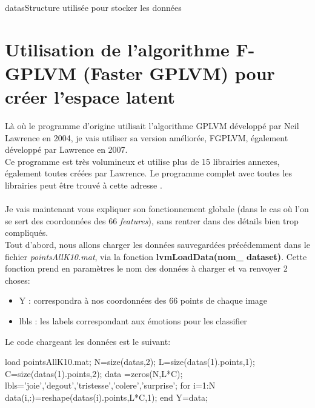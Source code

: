 \documentclass[poster]{polytech/polytech}
\begin{document}
\begin{Figure}{datas}{Structure utilisée pour stocker les données}
\end{Figure}

\section{Utilisation de l'algorithme F-GPLVM (Faster GPLVM) pour créer l'espace latent}
Là où le programme d'origine utilisait l'algorithme GPLVM développé par Neil Lawrence en 2004, je vais utiliser sa version améliorée, FGPLVM, également développé par Lawrence en 2007.\\
Ce programme est très volumineux et utilise plus de 15 librairies annexes, également toutes créées par Lawrence. Le programme complet avec toutes les librairies peut être trouvé à cette adresse \cite{gpmaster}.\\
\\
Je vais maintenant vous expliquer son fonctionnement globale (dans le cas où l'on se sert des coordonnées des 66 \textit{features}), sans rentrer dans des détails bien trop compliqués.\\
Tout d'abord, nous allons charger les données sauvegardées précédemment dans le fichier \textit{pointsAllK10.mat}, via la fonction \textbf{lvmLoadData(nom\_ dataset)}. Cette fonction prend en paramètres le nom des données à charger et va renvoyer 2 choses:
\begin{itemize}
	\item Y : correspondra à nos coordonnées des 66 points de chaque image
	\item lbls : les labels correspondant aux émotions pour les classifier\\
\end{itemize}
Le code chargeant les données est le suivant:
\begin{matlabsource}
load pointsAllK10.mat; %
N=size(datas,2); %
L=size(datas(1).points,1);%
C=size(datas(1).points,2);%
data =zeros(N,L*C);
lbls={'joie','degout','tristesse','colere','surprise'}; %
for i=1:N %
	data(i,:)=reshape(datas(i).points,L*C,1);%
end
Y=data; %
\end{matlabsource}
\end{document}
